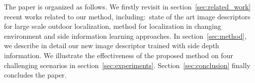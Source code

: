The paper is organized as follows. We firstly revisit in section~\ref{sec:related_work} recent works related to our method, including:~state of the art image descriptors for large scale outdoor localization, method for localization in changing environment and side information learning approaches. In section~\ref{sec:method}, we describe in detail our new image descriptor trained with side depth information. We illustrate the effectiveness of the proposed method on four challenging scenarios in section~\ref{sec:experiments}. Section~\ref{sec:conclusion} finally concludes the paper.